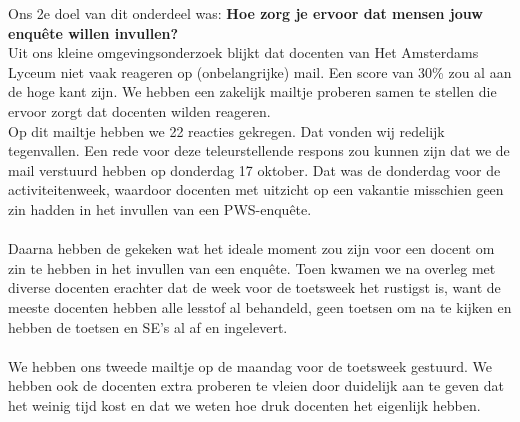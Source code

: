 \documentclass[12pt]{article}
\begin{document}
\pagebreak
\begin{multicols}{2}
Ons 2e doel van dit onderdeel was: \textbf{Hoe zorg je ervoor dat mensen jouw enquête willen invullen?}\\
Uit ons kleine omgevingsonderzoek blijkt dat docenten van Het Amsterdams Lyceum niet vaak reageren op (onbelangrijke) mail. Een score van 30\% zou al aan de hoge kant zijn. We hebben een zakelijk mailtje proberen samen te stellen die ervoor zorgt dat docenten wilden reageren. \\
Op dit mailtje hebben we 22 reacties gekregen. Dat vonden wij redelijk tegenvallen.
Een rede voor deze teleurstellende respons zou kunnen zijn dat we de mail verstuurd hebben op donderdag 17 oktober. Dat was de donderdag voor de activiteitenweek, waardoor docenten met uitzicht op een vakantie misschien geen zin hadden in het invullen van een PWS-enquête.\\
\\
Daarna hebben de gekeken wat het ideale moment zou zijn voor een docent om zin te hebben in het invullen van een enquête. Toen kwamen we na overleg met diverse docenten erachter dat de week voor de toetsweek het rustigst is, want de meeste docenten hebben alle lesstof al behandeld, geen toetsen om na te kijken en hebben de toetsen en SE's al af en ingelevert.  \\
\\
We hebben ons tweede mailtje op de maandag voor de toetsweek gestuurd. We hebben ook de docenten extra proberen te vleien door duidelijk aan te geven dat het weinig tijd kost en dat we weten hoe druk docenten het eigenlijk hebben.
\fbox{\begin{minipage}{\linewidth}
    

\end{minipage}}
\end{multicols}
\end{document}

